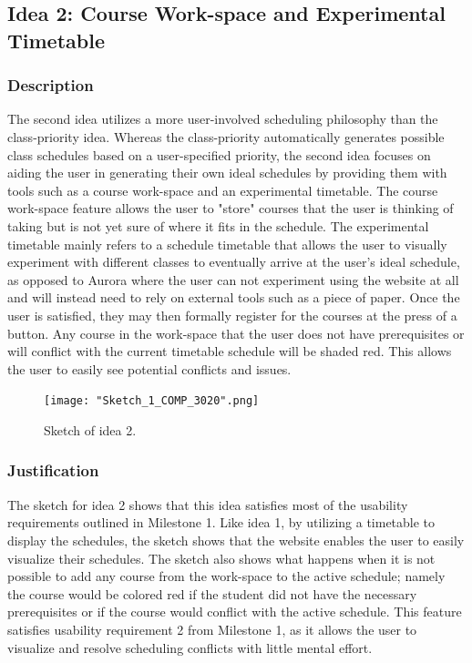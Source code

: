 \documentclass{article}
\begin{document}
\subsection{Idea 2: Course Work-space and Experimental Timetable}%
\subsubsection{Description}
The second idea utilizes a more user-involved scheduling philosophy than the class-priority idea. Whereas the class-priority automatically generates possible class schedules based on a user-specified priority, the second idea focuses on aiding the user in generating their own ideal schedules by providing them with tools such as a course work-space and an experimental timetable. The course work-space feature allows the user to "store" courses that the user is thinking of taking but is not yet sure of where it fits in the schedule. The experimental timetable mainly refers to a schedule timetable that allows the user to visually experiment with different classes to eventually arrive at the user's ideal schedule, as opposed to Aurora where the user can not experiment using the website at all and will instead need to rely on external tools such as a piece of paper. Once the user is satisfied, they may then formally register for the courses at the press of a button. Any course in the work-space that the user does not have prerequisites or will conflict with the current timetable schedule will be shaded red. This allows the user to easily see potential conflicts and issues.

\begin{figure}[!h]
\centering
\caption{Sketch of idea 2.}
\texttt{[image: "Sketch\_1\_COMP\_3020".png]}
\end{figure}

\subsubsection{Justification}
The sketch for idea 2 shows that this idea satisfies most of the usability requirements outlined in Milestone 1. Like idea 1, by utilizing a timetable to display the schedules, the sketch shows that the website enables the user to easily visualize their schedules. The sketch also shows what happens when it is not possible to add any course from the work-space to the active schedule; namely the course would be colored red if the student did not have the necessary prerequisites or if the course would conflict with the active schedule. This feature satisfies usability requirement 2 from Milestone 1, as it allows the user to visualize and resolve scheduling conflicts with little mental effort.
\end{document}
